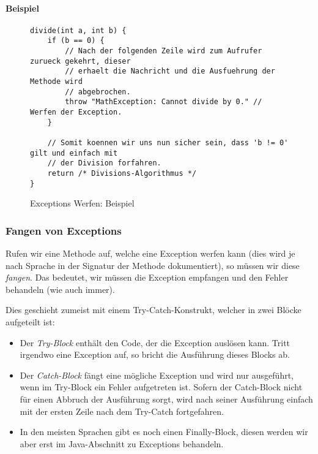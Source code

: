 		\paragraph{Beispiel}
			\begin{figure}[H]
				\centering
				\begin{lstlisting}
divide(int a, int b) {
	if (b == 0) {
		// Nach der folgenden Zeile wird zum Aufrufer zurueck gekehrt, dieser
		// erhaelt die Nachricht und die Ausfuehrung der Methode wird
		// abgebrochen.
		throw "MathException: Cannot divide by 0." // Werfen der Exception.
	}

	// Somit koennen wir uns nun sicher sein, dass 'b != 0' gilt und einfach mit
	// der Division forfahren.
	return /* Divisions-Algorithmus */
}
				\end{lstlisting}
				\caption{Exceptions Werfen: Beispiel}
				\label{fig:throw_exceptions}
			\end{figure}
	
	\subsubsection{Fangen von Exceptions}
		Rufen wir eine Methode auf, welche eine Exception werfen kann (dies wird je nach Sprache in der Signatur der Methode dokumentiert), so müssen wir diese \textit{fangen}. Das bedeutet, wir müssen die Exception empfangen und den Fehler behandeln (wie auch immer).
		
		Dies geschieht zumeist mit einem Try-Catch-Konstrukt, welcher in zwei Blöcke aufgeteilt ist:
		\begin{itemize}
			\item Der \textit{Try-Block} enthält den Code, der die Exception auslösen kann. Tritt irgendwo eine Exception auf, so bricht die Ausführung dieses Blocks ab.
			\item Der \textit{Catch-Block} fängt eine mögliche Exception und wird nur ausgeführt, wenn im Try-Block ein Fehler aufgetreten ist. Sofern der Catch-Block nicht für einen Abbruch der Ausführung sorgt, wird nach seiner Ausführung einfach mit der ersten Zeile nach dem Try-Catch fortgefahren.
			\item In den meisten Sprachen gibt es noch einen Finally-Block, diesen werden wir aber erst im Java-Abschnitt zu Exceptions behandeln.
		\end{itemize}
		
